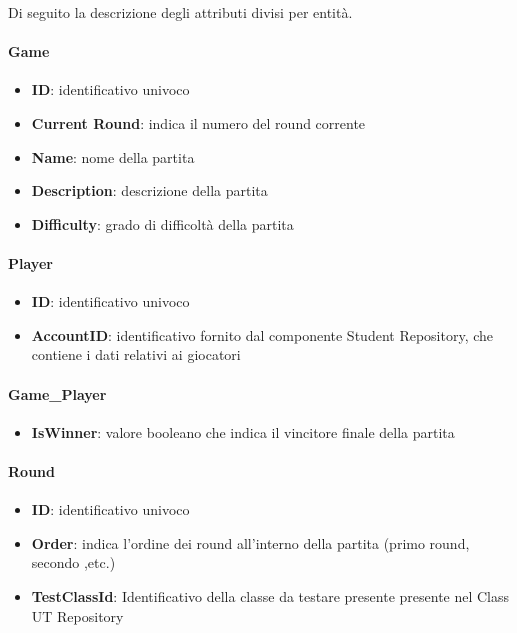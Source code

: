 \documentclass{article}
\begin{document}
Di seguito la descrizione degli attributi divisi per entità.

\paragraph{Game}
\begin{itemize}
    \item \textbf{ID}: identificativo univoco
    \item \textbf{Current Round}: indica il numero del round corrente
    \item \textbf{Name}: nome della partita
    \item \textbf{Description}: descrizione della partita
    \item \textbf{Difficulty}: grado di difficoltà della partita
\end{itemize}

\paragraph{Player}
\begin{itemize}
    \item \textbf{ID}: identificativo univoco
    \item \textbf{AccountID}: identificativo fornito dal componente Student Repository, che contiene i dati relativi ai giocatori
\end{itemize}

\paragraph{Game\_Player}

\begin{itemize}
    \item \textbf{IsWinner}: valore booleano che indica il vincitore finale della partita
\end{itemize}

\paragraph{Round}
\begin{itemize}
    \item \textbf{ID}: identificativo univoco
    \item \textbf{Order}: indica l'ordine dei round all'interno della partita (primo round, secondo ,etc.)
    \item \textbf{TestClassId}: Identificativo della classe da testare presente presente nel Class UT Repository
\end{itemize}
\end{document}
